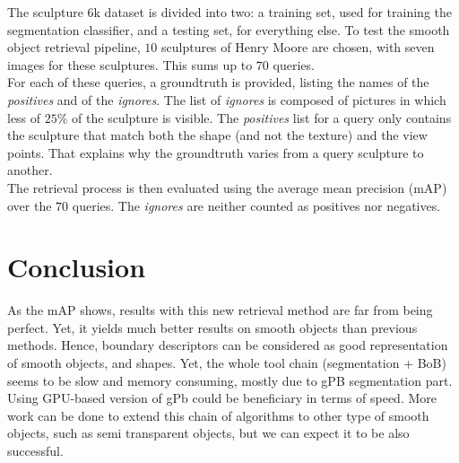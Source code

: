 \documentclass{article}
\begin{document}
The sculpture 6k dataset is divided into two: a training set, used for
training the segmentation classifier, and a testing set, for everything else.
To test the smooth object retrieval pipeline, $10$ sculptures of Henry Moore are
chosen, with seven images for these sculptures. This sums up to $70$ queries. \\
For each of these queries, a groundtruth is provided, listing the names of the
\textit{positives} and of the \textit{ignores}. The list of \textit{ignores} is
composed of pictures in which less of $25$\% of the sculpture is visible. The
\textit{positives} list for a query only contains the sculpture that match
both the shape (and not the texture) and the view points. That explains why
the groundtruth varies from a query sculpture to another. \\
The retrieval process is then evaluated using the average mean precision (mAP)
over the $70$ queries. The \textit{ignores} are neither counted as positives nor
negatives.


\section{Conclusion}

As the mAP shows, results with this new retrieval method are far from being
perfect. Yet, it yields much better results on smooth objects than previous
methods. Hence, boundary descriptors can be considered as good representation
of smooth objects, and shapes. Yet, the whole tool chain (segmentation + BoB)
seems to be slow and memory consuming, mostly due to gPB segmentation part. \\
Using GPU-based version of gPb could be beneficiary in terms of speed. More work can be done to extend this chain of algorithms to other type of
smooth objects, such as semi transparent objects, but we can expect it to be
also successful. \\



\end{document}
